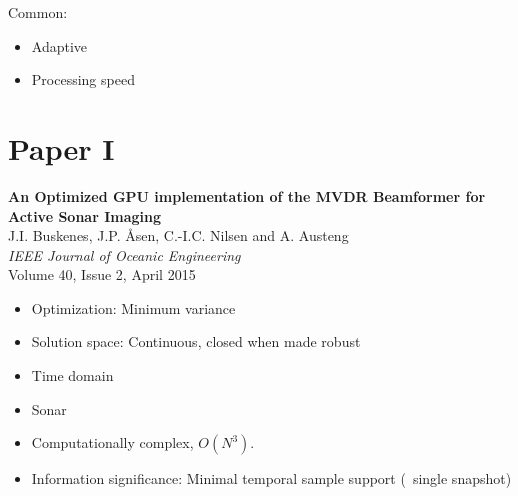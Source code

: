 Common:
\begin{itemize}\setlength\baselineskip{0pt}
\item Adaptive
\item Processing speed
\end{itemize}


\section{Paper I}\label{sec:paperI} %
\textbf{An Optimized GPU implementation of the MVDR Beamformer for Active Sonar Imaging}\\
J.I. Buskenes, J.P. Åsen, C.-I.C. Nilsen and A. Austeng\\
\textit{IEEE Journal of Oceanic Engineering}\\
Volume 40, Issue 2, April 2015

\begin{itemize}\setlength\baselineskip{0pt}
\item Optimization: Minimum variance
\item Solution space: Continuous, closed when made robust
\item Time domain
\item Sonar
\item Computationally complex, $O(N^3)$.
\item Information significance: Minimal temporal sample support (~single snapshot)
\end{itemize}

%
%
%


